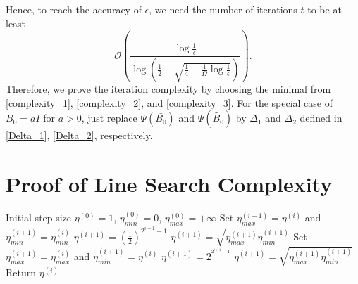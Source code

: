 \documentclass[11pt,letterpaper]{article}
\newcommand\0{{\Vector{0}}}
\newcommand\1{{\Vector{1}}}
\numberwithin{assumption}{section}
\numberwithin{definition}{section}
\numberwithin{theorem}{section}
\numberwithin{remark}{section}
\begin{document}
Hence, to reach the accuracy of $\epsilon$, we need the number of iterations $t$ to be at least
\begin{equation}\label{complexity_3}
    \mathcal{O}(\frac{\log{\frac{1}{\epsilon}}}{\log{\left(\frac{1}{2} + \sqrt{\frac{1}{4} + \frac{1}{\Omega}\log{\frac{1}{\epsilon}}}\right)}}).
\end{equation}
Therefore, we prove the iteration complexity by choosing the minimal from \eqref{complexity_1}, \eqref{complexity_2}, and \eqref{complexity_3}. For the special case of $B_0 = a I$ for $a > 0$, just replace $\Psi(\bar{B_0})$ and $\Psi(\tilde{B_0})$ by $\Delta_1$ and $\Delta_2$ defined in \eqref{Delta_1}, \eqref{Delta_2}, respectively.

\section{Proof of Line Search Complexity}\label{proof_of_linesearch}

\begin{algorithm}%
\caption{Log Bisection Algorithm for Weak Wolfe Conditions}\label{algo_wolfe} 
\begin{algorithmic}[1] 
{\REQUIRE Initial step size $\eta^{(0)} = 1$, $\eta^{(0)}_{min} = 0$, $\eta^{(0)}_{max} = +\infty$
    \label{line:sufficient_decrease}
        \STATE 
        Set $\eta^{(i + 1)}_{max} = \eta^{(i)}$ and  $\eta^{(i + 1)}_{min} = \eta^{(i)}_{min}$
            \STATE $\eta^{(i + 1)} = (\frac{1}{2})^{2^{i + 1} - 1}$
        \ELSE
            \STATE $\eta^{(i + 1)} = \sqrt{\eta^{(i + 1)}_{max}\eta^{(i + 1)}_{min}}$
        \ENDIF
    \label{line:curvature}
        \STATE Set $\eta^{(i + 1)}_{max} = \eta^{(i)}_{max}$ and $\eta^{(i + 1)}_{min} = \eta^{(i)}$
            \STATE $\eta^{(i + 1)} = 2^{^{2^{i + 1} - 1}}$
        \ELSE
            \STATE $\eta^{(i + 1)} = \sqrt{\eta^{(i + 1)}_{max}\eta^{(i + 1)}_{min}}$
        \ENDIF
    \ELSE
        \STATE Return $\eta^{(i)}$
    \ENDIF
\ENDFOR}
\end{algorithmic}
\end{algorithm}
\end{document}
